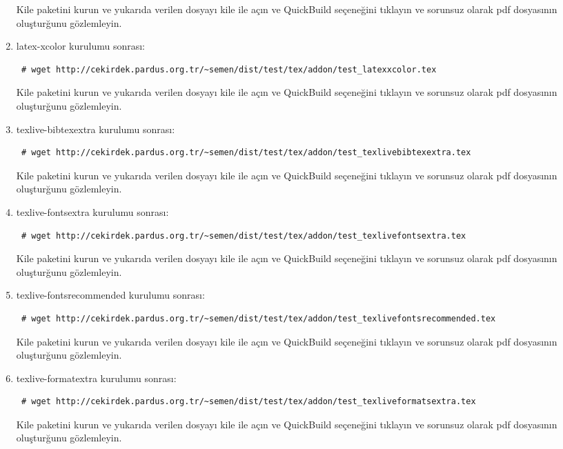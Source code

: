 \documentclass[a4paper,10pt]{article}
\begin{document}
\begin{enumerate}
Kile paketini kurun ve yukarıda verilen dosyayı kile ile açın ve QuickBuild  seçeneğini tıklayın ve sorunsuz olarak pdf dosyasının oluşturğunu gözlemleyin.

\item  latex-xcolor kurulumu sonrası:
\begin{verbatim}
 # wget http://cekirdek.pardus.org.tr/~semen/dist/test/tex/addon/test_latexxcolor.tex
\end{verbatim}

Kile paketini kurun ve yukarıda verilen dosyayı kile ile açın ve QuickBuild  seçeneğini tıklayın ve sorunsuz olarak pdf dosyasının oluşturğunu gözlemleyin.

\item texlive-bibtexextra kurulumu sonrası:
\begin{verbatim}
 # wget http://cekirdek.pardus.org.tr/~semen/dist/test/tex/addon/test_texlivebibtexextra.tex
\end{verbatim}

Kile paketini kurun ve yukarıda verilen dosyayı kile ile açın ve QuickBuild  seçeneğini tıklayın ve sorunsuz olarak pdf dosyasının oluşturğunu gözlemleyin.
\item texlive-fontsextra kurulumu sonrası:
\begin{verbatim}
 # wget http://cekirdek.pardus.org.tr/~semen/dist/test/tex/addon/test_texlivefontsextra.tex
\end{verbatim}

Kile paketini kurun ve yukarıda verilen dosyayı kile ile açın ve QuickBuild  seçeneğini tıklayın ve sorunsuz olarak pdf dosyasının oluşturğunu gözlemleyin.

\item texlive-fontsrecommended kurulumu sonrası:
\begin{verbatim}
 # wget http://cekirdek.pardus.org.tr/~semen/dist/test/tex/addon/test_texlivefontsrecommended.tex
\end{verbatim}

Kile paketini kurun ve yukarıda verilen dosyayı kile ile açın ve QuickBuild  seçeneğini tıklayın ve sorunsuz olarak pdf dosyasının oluşturğunu gözlemleyin.

\item texlive-formatextra kurulumu sonrası:
\begin{verbatim}
 # wget http://cekirdek.pardus.org.tr/~semen/dist/test/tex/addon/test_texliveformatsextra.tex
\end{verbatim}

Kile paketini kurun ve yukarıda verilen dosyayı kile ile açın ve QuickBuild  seçeneğini tıklayın ve sorunsuz olarak pdf dosyasının oluşturğunu gözlemleyin.


\end{enumerate}
\end{document}
